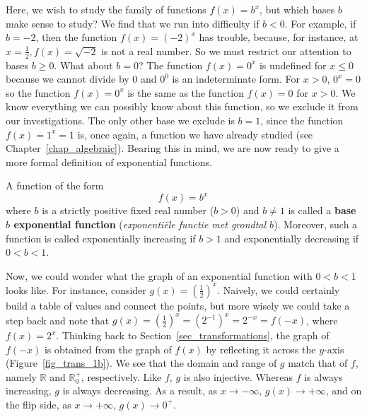 Here, we wish to study the family of functions $f(x) = b^{x}$, but which bases $b$ make sense to study?  We find that we run into difficulty if $b < 0$.  For example, if $b = -2$, then the function $f(x) = (-2)^{x}$ has trouble, because, for instance, at $x = \frac{1}{2}, f(x) = \sqrt{-2}$ is not a real number. So we must restrict our attention to bases $b \geq 0$.  What about $b = 0$?  The function $f(x) = 0^{x}$ is undefined for $x \leq 0$ because we cannot divide by $0$ and $0^{0}$ is an indeterminate form.  For $x > 0$, $0^{x} = 0$ so the function  $f(x) = 0^{x}$ is the same as the function $f(x) = 0$ for $x > 0$.  We know everything we can possibly know about this function, so we exclude it from our investigations.  The only other base we exclude is $b=1$, since the function $f(x) = 1^{x} = 1$ is, once again, a function we have already studied (see Chapter~\ref{chap_algebraic}). Bearing this in mind, we are now ready to give a more formal definition of exponential functions.

\begin{definition} 
\label{expfcndefn}  A function of the form 
$$f(x) = b^{x}\,$$ 
where $b$ is a strictly positive fixed real number ($b > 0$) and  $b \neq 1$ is called a \textbf{base $b$ exponential function} (\textit{exponenti\"ele functie met grondtal $b$}).   Moreover, such a function is called exponentially increasing if $b>1$ and exponentially decreasing if $0<b<1$. 
\end{definition}



Now, we could wonder what the graph of an exponential function with  $0 < b < 1$ looks like. For instance, consider $g(x) = \left(\frac{1}{2}\right)^{x}$.  Naively, we could certainly build a table of values and connect the points, but more wisely we could take a step back and note that $g(x) = \left(\frac{1}{2}\right)^{x} = \left(2^{-1}\right)^{x} = 2^{-x} = f(-x)$, where $f(x) = 2^{x}$.  Thinking back to Section~\ref{sec_transformations}, the graph of $f(-x)$ is obtained from the graph of $f(x)$ by reflecting it across the $y$-axis (Figure~\ref{fig_trans_1b}).  We see that the domain and range of $g$ match that of $f$, namely $\mathbb{R}$ and $\mathbb{R}^+_0$, respectively. Like $f$, $g$ is also injective.  Whereas $f$ is always increasing, $g$ is always decreasing.  As a result, as $x \rightarrow -\infty$, $g(x) \rightarrow +\infty$, and on the flip side, as $x \rightarrow +\infty$, $g(x) \rightarrow 0^{+}$.  


